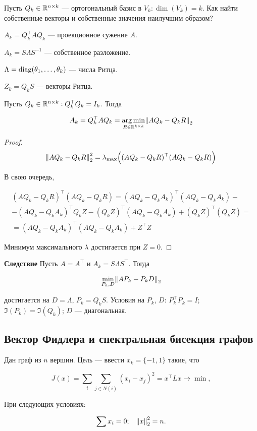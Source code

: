 Пусть $Q_k \in \mathbb{R}^{n \times k}$ --- ортогональный базис в $V_k: \dim(V_k) = k$.
Как найти собственные векторы и собственные значения наилучшим образом?

$A_k = Q_k^\top A Q_k$ --- проекционное сужение $A$.

$A_k = S \Lambda S^{-1}$ --- собственное разложение.

$\Lambda = \operatorname{diag}(\theta_1, \dots, \theta_k)$ --- числа Ритца.

$Z_k = Q_k S$ --- векторы Ритца.

\begin{theorem}
    Пусть $Q_k \in \mathbb{R}^{n \times k}: Q_k^\top Q_k = I_k$. Тогда

    \[
        A_k = Q_k^\top A Q_k = \operatorname*{\arg \min}_{R \in \mathbb{R}^{k \times k}}
            \norm{A Q_k - Q_k R}_2
    \]
\end{theorem}

\begin{proof}
    \[
        \norm{A Q_k - Q_k R}_2^2 = \lambda_{\max} \Big((A Q_k - Q_k R)^\top
            (A Q_k - Q_k R)\Big)
    \]

    В свою очередь,

    \begin{multline*}
        (A Q_k - Q_k R)^\top (A Q_k - Q_k R)
        = (A Q_k - Q_k A_k)^\top (A Q_k - Q_k A_k)
        -\\- (A Q_k - Q_k A_k)^\top Q_k Z
        - (Q_k Z)^\top (A Q_k - Q_k A_k) + (Q_k Z)^\top (Q_k Z) =\\=
        (A Q_k - Q_k A_k)^\top (A Q_k - Q_k A_k) + Z^\top Z
    \end{multline*}

    Минимум максимального $\lambda$ достигается при $Z = 0$.
\end{proof}

\textbf{Следствие} Пусть $A = A^\top$ и $A_k = S \Lambda S^\top$. Тогда

\[
    \min_{P_k, D} \norm{A P_k - P_k D}_2
\]

достигается на $D = \Lambda$, $P_k = Q_k S$. Условия на $P_k$, $D$:
$P_k^\top P_k = I$; $\Im(P_k) = \Im(Q_k)$; $D$ --- диагональная.

\subsection{Вектор Фидлера и спектральная бисекция графов}

Дан граф из $n$ вершин. Цель --- ввести $x_k = \{ -1, 1\}$ такие, что

\[
    J(x) = \sum_i \sum_{j \in N(i)} (x_i - x_j)^2 = x^\top L x \to \min,
\]

При следующих условиях:

\[
    \sum x_i = 0; \quad \norm{x}_2^2 = n.
\]

